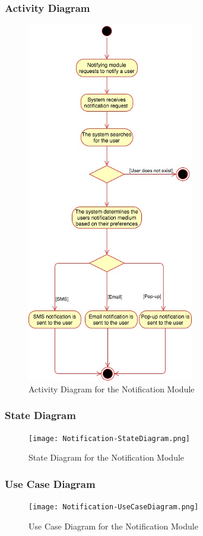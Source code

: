 \documentclass[runningheads,a4paper]{article}
\begin{document}
\subsubsection{Activity Diagram}
\begin{figure}[H]
   	\centering
   	\includegraphics{ActivityDiagram.png}
   	\caption{Activity Diagram for the Notification Module}
\end{figure}

\subsubsection{State Diagram}
\begin{figure}[H]
   	\centering
   	\texttt{[image: Notification-StateDiagram.png]}
   	\caption{State Diagram for the Notification Module}
\end{figure}

\subsubsection{Use Case Diagram}
\begin{figure}[H]
   	\centering
   	\texttt{[image: Notification-UseCaseDiagram.png]}
   	\caption{Use Case Diagram for the Notification Module}
\end{figure}
\end{document}
